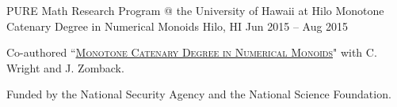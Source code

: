 \begin{cventries}

    \cventry
    {PURE Math Research Program @ the University of Hawaii at Hilo} %
    {Monotone Catenary Degree in Numerical Monoids} %
    {Hilo, HI} %
    {Jun 2015 -- Aug 2015} %
    {
        \begin{cvitems} %
        \item{Co-authored ``\href{https://arxiv.org/abs/1912.08114}
            {\color{awesome}\textsc{Monotone Catenary Degree in Numerical Monoids}}" with C. Wright and J. Zomback.}
        \item{Funded by the National Security Agency and the National Science Foundation.}
        \end{cvitems}
    }


\end{cventries}
